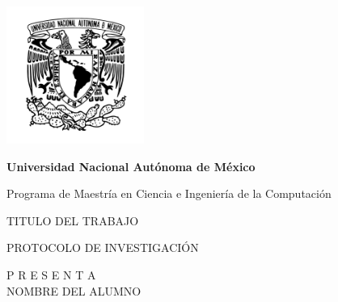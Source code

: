 \documentclass[letterpaper,12pt,oneside]{article}
\begin{document}
\begin{titlepage}
		\setlength{\parindent}{0pt} \setlength{\parskip}{0pt}
	
		\begin{center}
			\vfill 
			
			\begin{minipage}{\textwidth}
				
				
				\begin{center}
					\includegraphics[width=4.5cm]{UNAM_LOGO2.png}	
				\end{center} 	
				\begin{center}
					\Huge\textbf{Universidad Nacional Autónoma de México}
				\end{center} 
				
			\end{minipage}
				
			\vfill
			
			\begin{minipage}{0.7\textwidth}
				\begin{center}
					\large Programa de Maestría en Ciencia e Ingeniería de la Computación
				\end{center}
			\end{minipage}
			\begin{center}
				\vfill
				\large TITULO DEL TRABAJO
				
			\end{center}
			
			\begin{center}
				
				 PROTOCOLO DE INVESTIGACIÓN\\
			
				
				
				\begin{center}
					P R E S E N T A \\
					\large NOMBRE DEL ALUMNO
				\end{center}
				

\end{center}
\end{center}
\end{titlepage}
\end{document}
